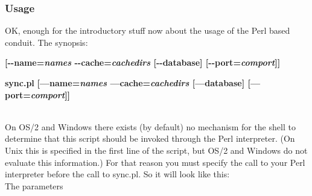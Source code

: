 \subsubsection{Usage}

OK, enough for the introductory stuff now about the usage of the
Perl based conduit. The synopsis:\\

\begin{latexonly}
 \textbf{[-{}-name=\emph{names} -{}-cache=\emph{cachedirs} [-{}-database]
     [-{}-port=\emph{comport}]]}\\
\end{latexonly}
\begin{htmlonly}
\textbf{sync.pl} \textbf{[---name=\emph{names} ---cache=\emph{cachedirs} [---database]
     [---port=\emph{comport}]]}
\end{htmlonly}\\


\note{} On OS/2 and Windows there exists (by default) no mechanism for 
the shell to determine that this script should be invoked through the
Perl interpreter. (On Unix this is specified in the first line of the 
script, but OS/2 and Windows do not evaluate this information.) For that 
reason you must specify the call to your Perl interpreter before the call 
to sync.pl. So it will look like this: \\

The parameters

